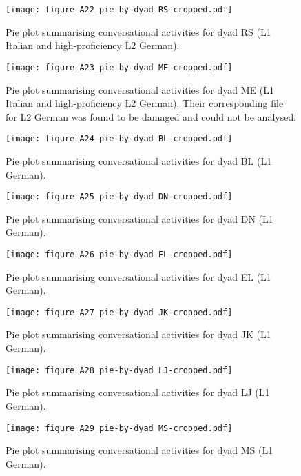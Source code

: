 \begin{figure}
\texttt{[image: figure\_A22\_pie-by-dyad RS-cropped.pdf]}
\caption{\label{fig:A22} Pie plot summarising conversational activities for dyad RS (L1 Italian and high-proficiency L2 German).}
\end{figure}

\begin{figure}
\texttt{[image: figure\_A23\_pie-by-dyad ME-cropped.pdf]}
\caption{\label{fig:A23} Pie plot summarising conversational activities for dyad ME (L1 Italian and high-proficiency L2 German). Their corresponding file for L2 German was found to be damaged and could not be analysed.}
\end{figure}

\begin{figure}
\texttt{[image: figure\_A24\_pie-by-dyad BL-cropped.pdf]}
\caption{\label{fig:A24} Pie plot summarising conversational activities for dyad BL (L1 German).}
\end{figure}

\begin{figure}
\texttt{[image: figure\_A25\_pie-by-dyad DN-cropped.pdf]}
\caption{\label{fig:A25} Pie plot summarising conversational activities for dyad DN (L1 German).}
\end{figure}

\begin{figure}
\texttt{[image: figure\_A26\_pie-by-dyad EL-cropped.pdf]}
\caption{\label{fig:A26} Pie plot summarising conversational activities for dyad EL (L1 German).}
\end{figure}

\begin{figure}
\texttt{[image: figure\_A27\_pie-by-dyad JK-cropped.pdf]}
\caption{\label{fig:A27} Pie plot summarising conversational activities for dyad JK (L1 German).}
\end{figure}

\begin{figure}
\texttt{[image: figure\_A28\_pie-by-dyad LJ-cropped.pdf]}
\caption{\label{fig:A28} Pie plot summarising conversational activities for dyad LJ (L1 German).}
\end{figure}

\begin{figure}
\texttt{[image: figure\_A29\_pie-by-dyad MS-cropped.pdf]}
\caption{\label{fig:A29} Pie plot summarising conversational activities for dyad MS (L1 German).}
\end{figure}

